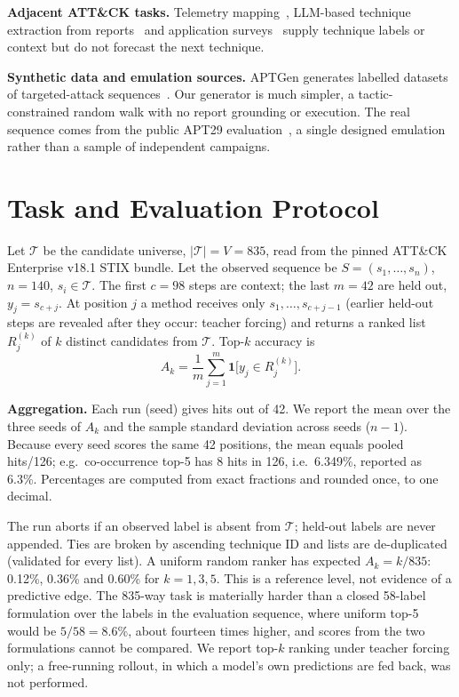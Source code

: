 \documentclass[conference]{IEEEtran}
\begin{document}
\textbf{Adjacent ATT\&CK tasks.} Telemetry mapping~\cite{lupinacci2026}, LLM-based technique extraction from reports~\cite{fayyazi2023,haque2026} and application surveys~\cite{roy2023sok,jiang2025} supply technique labels or context but do not forecast the next technique.

\textbf{Synthetic data and emulation sources.} APTGen generates labelled datasets of targeted-attack sequences~\cite{takahashi2020}. Our generator is much simpler, a tactic-constrained random walk with no report grounding or execution. The real sequence comes from the public APT29 evaluation~\cite{mitre_apt29,shen2024}, a single designed emulation rather than a sample of independent campaigns.

\section{Task and Evaluation Protocol}

Let $\mathcal{T}$ be the candidate universe, $|\mathcal{T}| = V = 835$, read from the pinned ATT\&CK Enterprise v18.1 STIX bundle. Let the observed sequence be $S = (s_1, \ldots, s_n)$, $n = 140$, $s_i \in \mathcal{T}$. The first $c = 98$ steps are context; the last $m = 42$ are held out, $y_j = s_{c+j}$. At position $j$ a method receives only $s_1, \ldots, s_{c+j-1}$ (earlier held-out steps are revealed after they occur: teacher forcing) and returns a ranked list $R_j^{(k)}$ of $k$ distinct candidates from $\mathcal{T}$. Top-$k$ accuracy is
\begin{equation}
A_k = \frac{1}{m} \sum_{j=1}^{m} \mathbf{1}\bigl[y_j \in R_j^{(k)}\bigr].
\end{equation}

\textbf{Aggregation.} Each run (seed) gives hits out of 42. We report the mean over the three seeds of $A_k$ and the sample standard deviation across seeds ($n-1$). Because every seed scores the same 42 positions, the mean equals pooled hits/126; e.g.\ co-occurrence top-5 has 8 hits in 126, i.e.\ 6.349\%, reported as 6.3\%. Percentages are computed from exact fractions and rounded once, to one decimal.

The run aborts if an observed label is absent from $\mathcal{T}$; held-out labels are never appended. Ties are broken by ascending technique ID and lists are de-duplicated (validated for every list). A uniform random ranker has expected $A_k = k/835$: 0.12\%, 0.36\% and 0.60\% for $k = 1, 3, 5$. This is a reference level, not evidence of a predictive edge. The 835-way task is materially harder than a closed 58-label formulation over the labels in the evaluation sequence, where uniform top-5 would be $5/58 = 8.6\%$, about fourteen times higher, and scores from the two formulations cannot be compared. We report top-$k$ ranking under teacher forcing only; a free-running rollout, in which a model's own predictions are fed back, was not performed.
\end{document}
